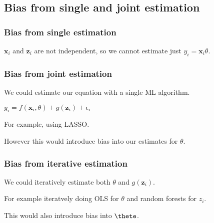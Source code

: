 
\subsection{Bias from single and joint estimation}

\subsubsection{Bias from single estimation}

\(\mathbf x_i\) and \(\mathbf z_i\) are not independent, so we cannot estimate just \(y_i=\mathbf x_i\theta \).

\subsubsection{Bias from joint estimation}

We could estimate our equation with a single ML algorithm.

\(y_i=f(\mathbf x_i, \theta) +g(\mathbf z_i) +\epsilon_i\)

For example, using LASSO.

However this would introduce bias into our estimates for \(\theta \).

\subsubsection{Bias from iterative estimation}

We could iteratively estimate both \(\theta \) and \(g(\mathbf z_i)\).

For example iteratvely doing OLS for \(\theta \) and random forests for \(z_i\).

This would also introduce bias into \(\thete \).

